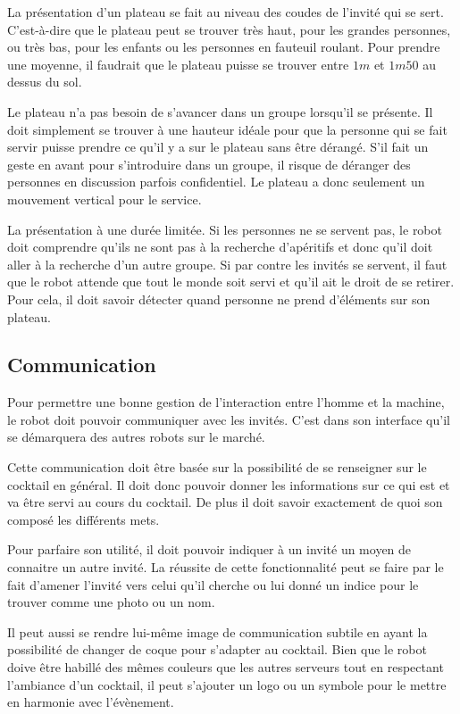 La présentation d’un plateau se fait au niveau des coudes de l’invité
qui se sert. C’est-à-dire que le plateau peut se trouver très haut,
pour les grandes personnes, ou très bas, pour les enfants ou les
personnes en fauteuil roulant. Pour prendre une moyenne, il faudrait
que le plateau puisse se trouver entre $1m$ et $1m50$ au dessus du
sol.

Le plateau n’a pas besoin de s’avancer dans un groupe lorsqu’il se
présente. Il doit simplement se trouver à une hauteur idéale pour que
la personne qui se fait servir puisse prendre ce qu’il y a sur le
plateau sans être dérangé. S’il fait un geste en avant pour
s’introduire dans un groupe, il risque de déranger des personnes en
discussion parfois confidentiel. Le plateau a donc seulement un
mouvement vertical pour le service.

La présentation à une durée limitée. Si les personnes ne se servent
pas, le robot doit comprendre qu’ils ne sont pas à la recherche
d’apéritifs et donc qu’il doit aller à la recherche d’un autre
groupe. Si par contre les invités se servent, il faut que le robot
attende que tout le monde soit servi et qu’il ait le droit de se
retirer. Pour cela, il doit savoir détecter quand personne ne prend
d’éléments sur son plateau. 


\subsection{Communication}
 
Pour permettre une bonne gestion de l’interaction entre l’homme et la
machine, le robot doit pouvoir communiquer avec les invités. C’est
dans son interface qu’il se démarquera des autres robots sur le
marché.

Cette communication doit être basée sur la possibilité de se
renseigner sur le cocktail en général. Il doit donc pouvoir donner les
informations sur ce qui est et va être servi au cours du cocktail. De
plus il doit savoir exactement de quoi son composé les différents
mets.

Pour parfaire son utilité, il doit pouvoir indiquer à un invité un
moyen de connaitre un autre invité. La réussite de cette
fonctionnalité peut se faire par le fait d’amener l’invité vers celui
qu’il cherche ou lui donné un indice pour le trouver comme une photo
ou un nom.

Il peut aussi se rendre lui-même image de communication subtile en
ayant la possibilité de changer de coque pour s’adapter au
cocktail. Bien que le robot doive être habillé des mêmes couleurs que
les autres serveurs tout en respectant l’ambiance d’un cocktail, il
peut s’ajouter un logo ou un symbole pour le mettre en harmonie avec
l’évènement.
